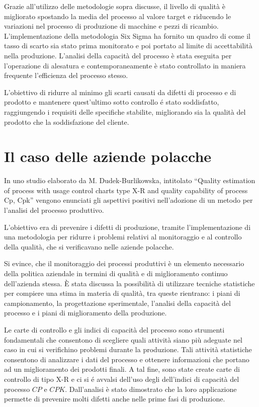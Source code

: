 Grazie all'utilizzo delle metodologie sopra discusse, il livello di qualità è migliorato spostando la media del processo al valore target e riducendo le variazioni nel processo di produzione di macchine e pezzi di ricambio. L'implementazione della metodologia Six Sigma ha fornito un quadro di come il tasso di scarto sia stato prima monitorato e poi portato al limite di accettabilità nella produzione. 
 L'analisi della capacità del processo è stata eseguita per l'operazione di alesatura e contemporaneamente è stato controllato in maniera frequente l'efficienza del processo stesso. 


 L'obiettivo di ridurre al minimo gli scarti causati da difetti di processo e di prodotto e mantenere quest'ultimo sotto controllo é stato soddisfatto, raggiungendo i requisiti delle specifiche stabilite, migliorando sia la qualità del prodotto che la soddisfazione del cliente. 
 \cite{KULKARNI2022329}


\section{Il caso delle aziende polacche}

In uno studio elaborato da M. Dudek-Burlikowska, intitolato ``Quality estimation of process with usage control charts type X-R and quality capability of process Cp, Cpk'' vengono enunciati gli aspettivi positivi nell'adozione di un metodo per l'analisi del processo produttivo.


L'obiettivo era di prevenire i difetti di produzione, tramite l'implementazione di una metodologia per ridurre i problemi relativi al monitoraggio e al controllo della qualità, che si verificavano nelle aziende polacche.


Si evince, che il monitoraggio dei processi produttivi è un elemento necessario della politica aziendale in termini di qualità e di miglioramento continuo dell'azienda stessa.
È stata discussa la possibilità di utilizzare tecniche statistiche per compiere una stima in materia di qualità, tra queste rientrano: i piani di campionamento, la progettazione sperimentale, l'analisi della capacità del processo e i piani di miglioramento della produzione. 

Le carte di controllo e gli indici di capacità del processo sono strumenti fondamentali che consentono di scegliere quali attività siano più adeguate nel caso in cui si verifichino problemi durante la produzione. 
Tali attività statistiche consentono di analizzare i dati del processo e ottenere informazioni che portano ad un miglioramento dei prodotti finali.
A tal fine, sono state create carte di controllo di tipo X-R e ci si é avvalsi dell'uso degli dell'indici di capacità del processo $CP$ e $CPK$. 
Dall'analisi è stato dimostrato che la loro applicazione permette di prevenire molti difetti anche nelle prime fasi di produzione.

